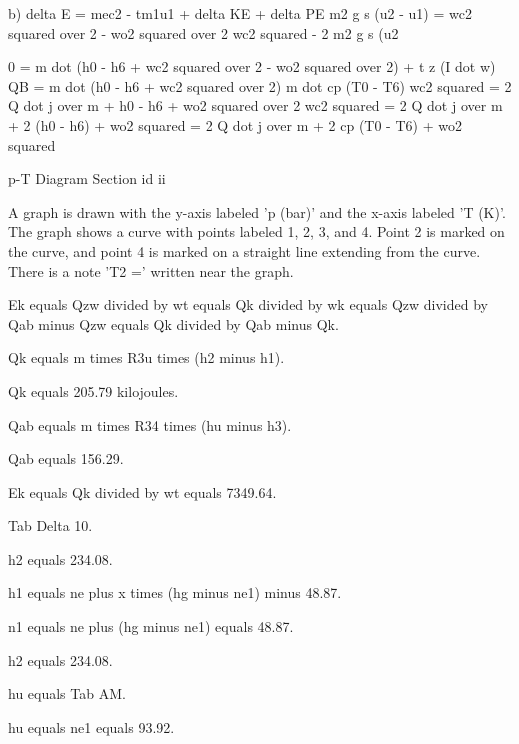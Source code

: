 b) delta E = mec2 - tm1u1 + delta KE + delta PE  
m2 g s (u2 - u1) = wc2 squared over 2 - wo2 squared over 2  
wc2 squared - 2 m2 g s (u2  

0 = m dot (h0 - h6 + wc2 squared over 2 - wo2 squared over 2) + t z (I dot w)  
QB = m dot (h0 - h6 + wc2 squared over 2)  
m dot cp (T0 - T6)  
wc2 squared = 2 Q dot j over m + h0 - h6 + wo2 squared over 2  
wc2 squared = 2 Q dot j over m + 2 (h0 - h6) + wo2 squared  
= 2 Q dot j over m + 2 cp (T0 - T6) + wo2 squared

p-T Diagram Section id ii

A graph is drawn with the y-axis labeled 'p (bar)' and the x-axis labeled 'T (K)'. The graph shows a curve with points labeled 1, 2, 3, and 4. Point 2 is marked on the curve, and point 4 is marked on a straight line extending from the curve. There is a note 'T2 =' written near the graph.

Ek equals Qzw divided by wt equals Qk divided by wk equals Qzw divided by Qab minus Qzw equals Qk divided by Qab minus Qk.

Qk equals m times R3u times (h2 minus h1).

Qk equals 205.79 kilojoules.

Qab equals m times R34 times (hu minus h3).

Qab equals 156.29.

Ek equals Qk divided by wt equals 7349.64.

Tab Delta 10.

h2 equals 234.08.

h1 equals ne plus x times (hg minus ne1) minus 48.87.

n1 equals ne plus (hg minus ne1) equals 48.87.

h2 equals 234.08.

hu equals Tab AM.

hu equals ne1 equals 93.92.